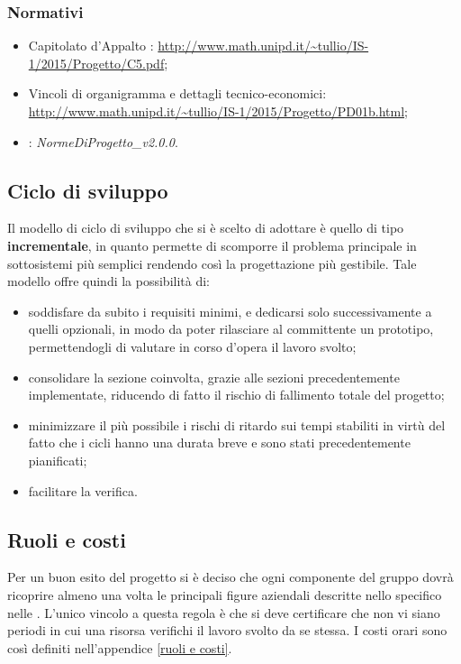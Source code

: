 \documentclass[12pt,a4paper]{article}
\begin{document}
\subsubsection{Normativi}
\begin{itemize}
	\item Capitolato d’Appalto \prjL: \url{http://www.math.unipd.it/~tullio/IS-1/2015/Progetto/C5.pdf};
	\item Vincoli di organigramma e dettagli tecnico-economici: \url{http://www.math.unipd.it/~tullio/IS-1/2015/Progetto/PD01b.html};
	\item \NdP: \textit{NormeDiProgetto\_v2.0.0}. 
\end{itemize}

\subsection{Ciclo di sviluppo}
Il modello di ciclo di sviluppo che si è scelto di adottare è quello di tipo \textbf{incrementale}, in quanto permette di scomporre il problema principale in sottosistemi più semplici rendendo così la progettazione più gestibile. Tale modello offre quindi la possibilità di:
\begin{itemize}
	\item soddisfare da subito i requisiti minimi, e dedicarsi solo successivamente a quelli opzionali, in modo da poter rilasciare al committente un prototipo, permettendogli di valutare in corso d'opera il lavoro svolto;
	\item consolidare la sezione coinvolta, grazie alle sezioni precedentemente implementate, riducendo di fatto il rischio di fallimento totale del progetto;
	\item minimizzare il più possibile i rischi di ritardo sui tempi stabiliti in virtù del fatto che i cicli hanno una durata breve e sono stati precedentemente pianificati;
	\item facilitare la verifica.
\end{itemize}

\subsection{Ruoli e costi}
Per un buon esito del progetto si è deciso che ogni componente del gruppo dovrà ricoprire almeno una volta le principali figure aziendali descritte nello specifico nelle \NdP{}. L'unico vincolo a questa regola è che si deve certificare che non vi siano periodi in cui una risorsa verifichi il lavoro svolto da se stessa. I costi orari sono così definiti nell'appendice \ref{ruoli e costi}. 
\end{document}
